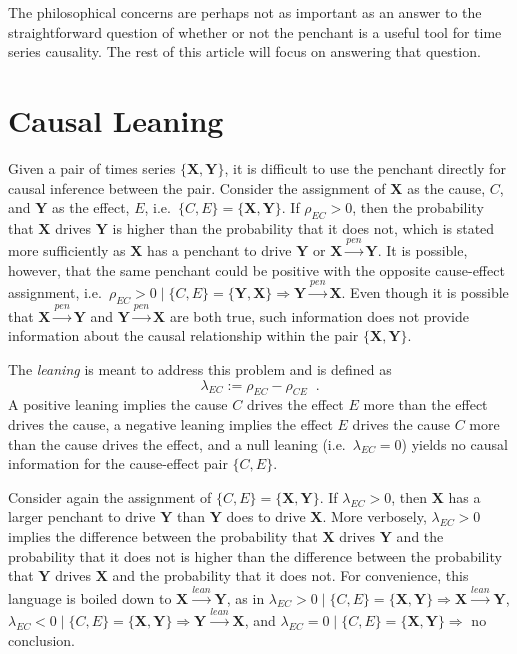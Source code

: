\documentclass[a4paper,11pt,twocolumn]{article}
\begin{document}
The philosophical concerns are perhaps not as important as an answer to the straightforward question of whether or not the penchant is a useful tool for time series causality.  The rest of this article will focus on answering that question.

\section{Causal Leaning}
Given a pair of times series $\{\mathbf{X},\mathbf{Y}\}$, it is difficult to use the penchant directly for causal inference between the pair.  Consider the assignment of $\mathbf{X}$ as the cause, $C$, and $\mathbf{Y}$ as the effect, $E$, i.e.\ $\{C,E\}=\{\mathbf{X},\mathbf{Y}\}$.  If $\rho_{EC}>0$, then the probability that $\mathbf{X}$ drives $\mathbf{Y}$ is higher than the probability that it does not, which is stated more sufficiently as $\mathbf{X}$ has a penchant to drive $\mathbf{Y}$ or $\mathbf{X}\xrightarrow{pen}\mathbf{Y}$.  It is possible, however, that the same penchant could be positive with the opposite cause-effect assignment, i.e.\ $\rho_{EC}>0\;|\; \{C,E\}=\{\mathbf{Y},\mathbf{X}\}\Rightarrow \mathbf{Y}\xrightarrow{pen}\mathbf{X}$.  Even though it is possible that $\mathbf{X}\xrightarrow{pen}\mathbf{Y}$ and $\mathbf{Y}\xrightarrow{pen}\mathbf{X}$ are both true, such information does not provide information about the causal relationship within the pair $\{\mathbf{X},\mathbf{Y}\}$.  

The {\em leaning} is meant to address this problem and is defined as
\begin{equation}
\label{eq:leaning}
\lambda_{EC} := \rho_{EC} - \rho_{CE}\;\;.
\end{equation}
A positive leaning implies the cause $C$ drives the effect $E$ more than the effect drives the cause, a negative leaning implies the effect $E$ drives the cause $C$ more than the cause drives the effect, and a null leaning (i.e.\ $\lambda_{EC} = 0$) yields no causal information for the cause-effect pair $\{C,E\}$.  

Consider again the assignment of $\{C,E\}=\{\mathbf{X},\mathbf{Y}\}$.  If $\lambda_{EC}>0$, then $\mathbf{X}$ has a larger penchant to drive $\mathbf{Y}$ than $\mathbf{Y}$ does to drive $\mathbf{X}$.  More verbosely, $\lambda_{EC}>0$ implies the difference between the probability that $\mathbf{X}$ drives $\mathbf{Y}$ and the probability that it does not is higher than the difference between the probability that $\mathbf{Y}$ drives $\mathbf{X}$ and the probability that it does not.  For convenience, this language is boiled down to $\mathbf{X}\xrightarrow{lean}\mathbf{Y}$, as in
$\lambda_{EC}>0\;|\; \{C,E\}=\{\mathbf{X},\mathbf{Y}\}\Rightarrow\mathbf{X}\xrightarrow{lean}\mathbf{Y}$, $\lambda_{EC}<0\;|\; \{C,E\}=\{\mathbf{X},\mathbf{Y}\}\Rightarrow\mathbf{Y}\xrightarrow{lean}\mathbf{X}$, and $\lambda_{EC}=0\;|\; \{C,E\}=\{\mathbf{X},\mathbf{Y}\}\Rightarrow$ no conclusion.
\end{document}
